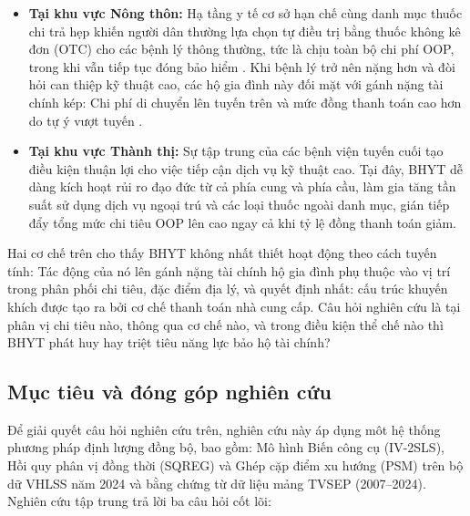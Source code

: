 \documentclass[12pt,a4paper]{article}
\begin{document}
\begin{itemize}
	\item \textbf{Tại khu vực Nông thôn:} Hạ tầng y tế cơ sở hạn chế cùng danh mục thuốc chi trả hẹp khiến người dân thường lựa chọn tự điều trị bằng thuốc không kê đơn (OTC) cho các bệnh lý thông thường, tức là chịu toàn bộ chi phí OOP, trong khi vẫn tiếp tục đóng bảo hiểm  \parencite{lee2019ijerph}. Khi bệnh lý trở nên nặng hơn và đòi hỏi can thiệp kỹ thuật cao, các hộ gia đình này đối mặt với gánh nặng tài chính kép: Chi phí di chuyển lên tuyến trên và mức đồng thanh toán cao hơn do tự ý vượt tuyến .
	
	\item \textbf{Tại khu vực Thành thị:} Sự tập trung của các bệnh viện tuyến cuối tạo điều kiện thuận lợi cho việc tiếp cận dịch vụ kỹ thuật cao. Tại đây, BHYT dễ dàng kích hoạt rủi ro đạo đức  từ cả phía cung và phía cầu, làm gia tăng tần suất sử dụng dịch vụ ngoại trú và các loại thuốc ngoài danh mục, gián tiếp đẩy tổng mức chi tiêu OOP lên cao \parencite{thuong2020} ngay cả khi tỷ lệ đồng thanh toán giảm.
\end{itemize}

Hai cơ chế trên cho thấy BHYT không nhất thiết hoạt động theo cách tuyến tính: Tác 
động của nó lên gánh nặng tài chính hộ gia đình phụ thuộc vào vị trí trong phân phối 
chi tiêu, đặc điểm địa lý, và quyết định nhất: cấu trúc khuyến khích được tạo ra 
bởi cơ chế thanh toán nhà cung cấp. Câu hỏi nghiên cứu là tại phân vị chi tiêu nào, thông 
qua cơ chế nào, và trong điều kiện thể chế nào thì BHYT phát huy hay triệt tiêu năng 
lực bảo hộ tài chính?

\subsection{Mục tiêu và đóng góp nghiên cứu}

Để giải quyết câu hỏi nghiên cứu trên, nghiên cứu này áp dụng môt hệ thống phương pháp định lượng đồng bộ, bao gồm: Mô hình Biến công cụ (IV-2SLS), Hồi quy phân vị đồng thời (SQREG) và Ghép cặp điểm xu hướng (PSM) trên bộ dữ VHLSS năm 2024 và bằng chứng từ dữ liệu mảng TVSEP 
(2007--2024). Nghiên cứu tập trung trả lời ba câu hỏi cốt lõi:
\end{document}
